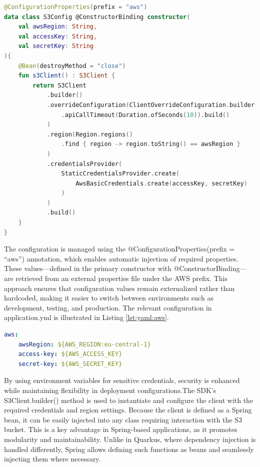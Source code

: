 \begin{lstlisting}[language=Kotlin,caption=Configuring the S3 Client,label=lst:kotlin:s3client]
@ConfigurationProperties(prefix = "aws")
data class S3Config @ConstructorBinding constructor(
    val awsRegion: String,
    val accessKey: String,
    val secretKey: String
){
    @Bean(destroyMethod = "close")
    fun s3Client() : S3Client {
        return S3Client
            .builder()
            .overrideConfiguration(ClientOverrideConfiguration.builder()
                .apiCallTimeout(Duration.ofSeconds(10)).build()
            )
            .region(Region.regions()
                .find { region -> region.toString() == awsRegion }
            )
            .credentialsProvider(
                StaticCredentialsProvider.create(
                    AwsBasicCredentials.create(accessKey, secretKey)
                )
            )
            .build()
    }
}
\end{lstlisting}

The configuration is managed using the @ConfigurationProperties(prefix = ``aws'') annotation, which enables automatic injection of required properties. These values—defined in the primary constructor with @ConstructorBinding—are retrieved from an external properties file under the AWS prefix. This approach ensures that configuration values remain externalized rather than hardcoded, making it easier to switch between environments such as development, testing, and production. The relevant configuration in application.yml is illustrated in Listing \ref{lst:yaml:aws}.
\begin{lstlisting}[language=Yaml, caption=AWS Configuration in application.yml, label=lst:yaml:aws]
aws:
    awsRegion: ${AWS_REGION:eu-central-1}
    access-key: ${AWS_ACCESS_KEY}
    secret-key: ${AWS_SECRET_KEY}
\end{lstlisting}

By using environment variables for sensitive credentials, security is enhanced while maintaining flexibility in deployment configurations.The SDK’s S3Client.builder() method is used to instantiate and configure the client with the required credentials and region settings. Because the client is defined as a Spring bean, it can be easily injected into any class requiring interaction with the S3 bucket. This is a key advantage in Spring-based applications, as it promotes modularity and maintainability. Unlike in Quarkus, where dependency injection is handled differently, Spring allows defining such functions as beans and seamlessly injecting them where necessary.

